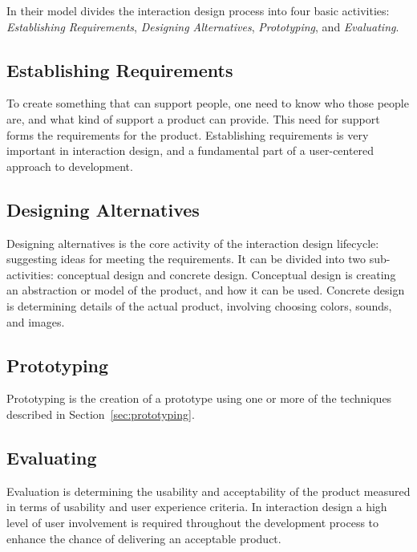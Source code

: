 \documentclass[../Main/thesis.tex]{subfiles}
\begin{document}
In their model \citet{Preece2011} divides the interaction design process into four basic activities: \textit{Establishing Requirements}, \textit{Designing Alternatives}, \textit{Prototyping}, and \textit{Evaluating}.

\subsection{Establishing Requirements}
To create something that can support people, one need to know who those people are, and what kind of support a product can provide. 
This need for support forms the requirements for the product.
Establishing requirements is very important in interaction design, and a fundamental part of a user-centered approach to development\citep{Preece2011}.

\subsection{Designing Alternatives}
Designing alternatives is the core activity of the interaction design lifecycle: suggesting ideas for meeting the requirements.
It can be divided into two sub-activities: conceptual design and concrete design.
Conceptual design is creating an abstraction or model of the product, and how it can be used.
Concrete design is determining details of the actual product, involving choosing colors, sounds, and images\citep{Preece2011}.

\subsection{Prototyping}
Prototyping is the creation of a prototype using one or more of the techniques described in Section~\ref{sec:prototyping}.

\subsection{Evaluating}
Evaluation is determining the usability and acceptability of the product measured in terms of usability and user experience criteria.
In interaction design a high level of user involvement is required throughout the development process to enhance the chance of delivering an acceptable product\citep{Preece2011}.
\end{document}
